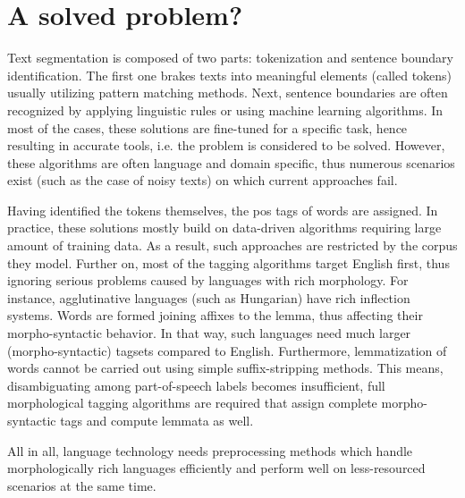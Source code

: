 \section{A solved problem?}



Text segmentation is composed of two parts: tokenization and sentence boundary identification. 
The first one brakes texts into meaningful elements (called tokens) usually utilizing pattern matching methods.
Next, sentence boundaries are often recognized by applying linguistic rules or using machine learning algorithms.
In most of the cases, these solutions are fine-tuned for a specific task, hence resulting in accurate tools, i.e. the problem is considered to be solved.
However, these algorithms are often language and domain specific, thus numerous scenarios exist (such as the case of noisy texts) on which current approaches fail.

Having identified the tokens themselves, the \gls{pos} tags of words are assigned.
In practice, these solutions mostly build on data-driven algorithms requiring large amount of training data.
As a result, such approaches are restricted by the corpus they model.
Further on, most of the tagging algorithms target English first, thus ignoring serious problems caused by languages with rich morphology.
For instance, agglutinative languages (such as Hungarian) have rich inflection systems.
Words are formed joining affixes to the lemma, thus affecting their morpho-syntactic behavior.
In that way, such languages need much larger (morpho-syntactic) tagsets compared to English. 
Furthermore, lemmatization of words cannot be carried out using simple suffix-stripping methods.
This means, disambiguating among part-of-speech labels becomes insufficient, full morphological tagging algorithms are required that assign complete morpho-syntactic tags and compute lemmata as well.

All in all, language technology needs preprocessing methods which handle morphologically rich languages efficiently 
and perform well on less-resourced scenarios at the same time.

